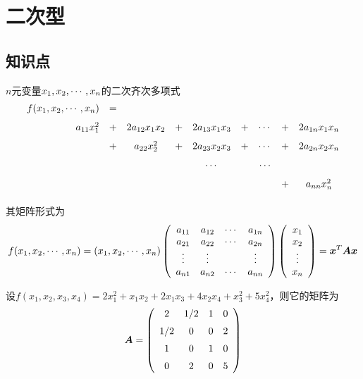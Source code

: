 \section{二次型}

\subsection{知识点}

\begin{frame}
  
  \begin{dingyi}
    $n$元变量$x_1,x_2,\cdots,x_n$的二次齐次多项式
    $$
    \begin{array}{rcccccccc}
      f(x_1,x_2,\cdots,x_n) &=& \\[0.1in]
      a_{11}x_1^2&+&2a_{12}x_1x_2&+&2a_{13}x_1x_3&+&\cdots&+&2a_{1n}x_1x_n\\[0.1in]
                         &+&a_{22}x_2^2&+&2a_{23}x_2x_3&+&\cdots&+&2a_{2n}x_2x_n\\[0.1in]
                         &&&&\cdots&&\cdots\\[0.1in]
                         &&&&&&&+&a_{nn}x_n^2\\[0.1in]
    \end{array}
    $$
    其矩阵形式为
    $$
    f(x_1,x_2,\cdots,x_n)=   (x_1,x_2,\cdots,x_n)\left(
      \begin{array}{cccc}
        a_{11}&a_{12}&\cdots&a_{1n}\\
        a_{21}&a_{22}&\cdots&a_{2n}\\
        \vdots&\vdots&&\vdots\\
        a_{n1}&a_{n2}&\cdots&a_{nn}\\
      \end{array}
    \right)\left(
      \begin{array}{c}
        x_1\\
        x_2\\
        \vdots\\
        x_n
      \end{array}\right) = {\boldsymbol{x}}^T\boldsymbol{A}{\boldsymbol{x}}
    $$
  \end{dingyi}
  
\end{frame}




\begin{frame}
  
  \begin{li}
    设$f(x_1,x_2,x_3,x_4)=2x_1^2+x_1x_2+2x_1x_3+4x_2x_4+x_3^2+5x_4^2$，则它的矩阵为
    $$
    \boldsymbol{A}=\left(
      \begin{array}{cccc}
        2&\displaystyle1/2&1&0\\[0.2cm]
        \displaystyle1/2&0&0&2\\[0.2cm]
        1&0&1&0\\[0.2cm]
        0&2&0&5
      \end{array}
    \right)
    $$
  \end{li}
  
\end{frame}


